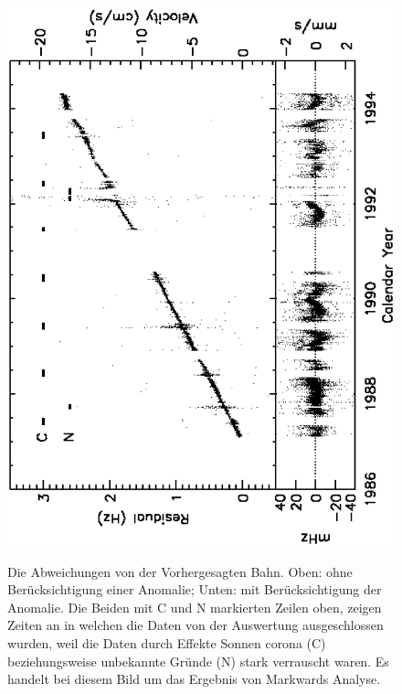 \begin{figure}[htbb]
\begin{minipage}[t]{.6\linewidth}
	\centering
	\includegraphics[width=\linewidth,angle={-90}]{images/M02P10beide}
	\label{fig:Markwardvergl}
  \caption{Die Abweichungen von der Vorhergesagten Bahn. Oben: ohne Berücksichtigung einer Anomalie; Unten: mit Berücksichtigung der Anomalie. Die Beiden mit C und N markierten Zeilen oben, zeigen Zeiten an in welchen die Daten von der Auswertung ausgeschlossen wurden, weil die Daten durch Effekte Sonnen corona (C) beziehungsweise unbekannte Gründe (N) stark verrauscht waren. Es handelt bei diesem Bild um das Ergebnis von Markwards Analyse.\cite{Markwardt2002}}
\end{minipage}
	\centering
 \end{figure}
 
